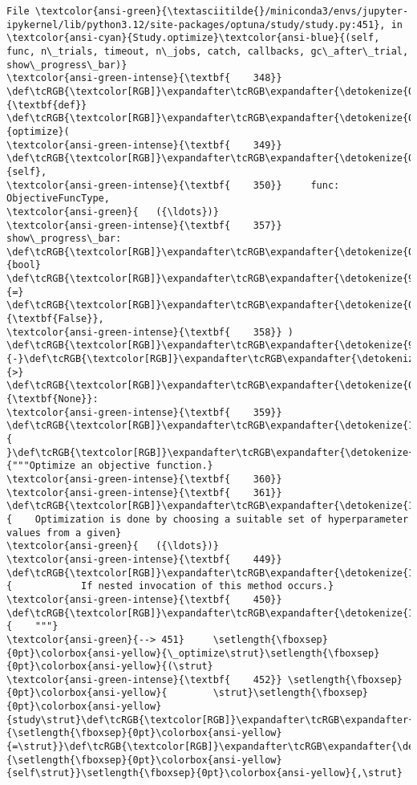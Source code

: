 \documentclass[11pt]{article}
\begin{document}
\begin{Verbatim}[commandchars=\\\{\}, frame=single, framerule=2mm, rulecolor=\color{outerrorbackground}]
File \textcolor{ansi-green}{\textasciitilde{}/miniconda3/envs/jupyter-ipykernel/lib/python3.12/site-packages/optuna/study/study.py:451}, in \textcolor{ansi-cyan}{Study.optimize}\textcolor{ansi-blue}{(self, func, n\_trials, timeout, n\_jobs, catch, callbacks, gc\_after\_trial, show\_progress\_bar)}
\textcolor{ansi-green-intense}{\textbf{    348}} \def\tcRGB{\textcolor[RGB]}\expandafter\tcRGB\expandafter{\detokenize{0,135,0}}{\textbf{def}} \def\tcRGB{\textcolor[RGB]}\expandafter\tcRGB\expandafter{\detokenize{0,0,255}}{optimize}(
\textcolor{ansi-green-intense}{\textbf{    349}}     \def\tcRGB{\textcolor[RGB]}\expandafter\tcRGB\expandafter{\detokenize{0,135,0}}{self},
\textcolor{ansi-green-intense}{\textbf{    350}}     func: ObjectiveFuncType,
\textcolor{ansi-green}{   ({\ldots})}
\textcolor{ansi-green-intense}{\textbf{    357}}     show\_progress\_bar: \def\tcRGB{\textcolor[RGB]}\expandafter\tcRGB\expandafter{\detokenize{0,135,0}}{bool} \def\tcRGB{\textcolor[RGB]}\expandafter\tcRGB\expandafter{\detokenize{98,98,98}}{=} \def\tcRGB{\textcolor[RGB]}\expandafter\tcRGB\expandafter{\detokenize{0,135,0}}{\textbf{False}},
\textcolor{ansi-green-intense}{\textbf{    358}} ) \def\tcRGB{\textcolor[RGB]}\expandafter\tcRGB\expandafter{\detokenize{98,98,98}}{-}\def\tcRGB{\textcolor[RGB]}\expandafter\tcRGB\expandafter{\detokenize{98,98,98}}{>} \def\tcRGB{\textcolor[RGB]}\expandafter\tcRGB\expandafter{\detokenize{0,135,0}}{\textbf{None}}:
\textcolor{ansi-green-intense}{\textbf{    359}} \def\tcRGB{\textcolor[RGB]}\expandafter\tcRGB\expandafter{\detokenize{188,188,188}}{    }\def\tcRGB{\textcolor[RGB]}\expandafter\tcRGB\expandafter{\detokenize{175,0,0}}{"""Optimize an objective function.}
\textcolor{ansi-green-intense}{\textbf{    360}} 
\textcolor{ansi-green-intense}{\textbf{    361}} \def\tcRGB{\textcolor[RGB]}\expandafter\tcRGB\expandafter{\detokenize{175,0,0}}{    Optimization is done by choosing a suitable set of hyperparameter values from a given}
\textcolor{ansi-green}{   ({\ldots})}
\textcolor{ansi-green-intense}{\textbf{    449}} \def\tcRGB{\textcolor[RGB]}\expandafter\tcRGB\expandafter{\detokenize{175,0,0}}{            If nested invocation of this method occurs.}
\textcolor{ansi-green-intense}{\textbf{    450}} \def\tcRGB{\textcolor[RGB]}\expandafter\tcRGB\expandafter{\detokenize{175,0,0}}{    """}
\textcolor{ansi-green}{--> 451}     \setlength{\fboxsep}{0pt}\colorbox{ansi-yellow}{\_optimize\strut}\setlength{\fboxsep}{0pt}\colorbox{ansi-yellow}{(\strut}
\textcolor{ansi-green-intense}{\textbf{    452}} \setlength{\fboxsep}{0pt}\colorbox{ansi-yellow}{        \strut}\setlength{\fboxsep}{0pt}\colorbox{ansi-yellow}{study\strut}\def\tcRGB{\textcolor[RGB]}\expandafter\tcRGB\expandafter{\detokenize{98,98,98}}{\setlength{\fboxsep}{0pt}\colorbox{ansi-yellow}{=\strut}}\def\tcRGB{\textcolor[RGB]}\expandafter\tcRGB\expandafter{\detokenize{0,135,0}}{\setlength{\fboxsep}{0pt}\colorbox{ansi-yellow}{self\strut}}\setlength{\fboxsep}{0pt}\colorbox{ansi-yellow}{,\strut}

\end{Verbatim}
\end{document}
